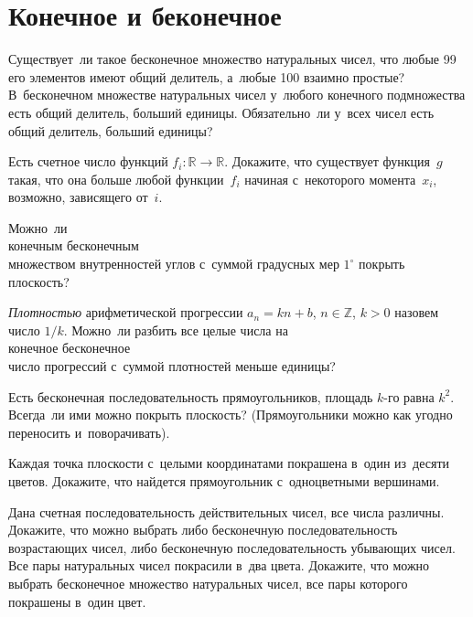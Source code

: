 
\section*{Конечное и беконечное}


\begin{problems}

\item
\subproblem
Существует~ли такое бесконечное множество натуральных чисел, что любые 99 его
элементов имеют общий делитель, а~любые 100 взаимно простые?
\\
\subproblem
В~бесконечном множестве натуральных чисел у~любого конечного подмножества есть
общий делитель, больший единицы.
Обязательно~ли у~всех чисел есть общий делитель, больший единицы?

\item
Есть счетное число функций $f_{i} \colon \mathbb{R} \to \mathbb{R}$.
Докажите, что существует функция~$g$ такая, что она больше любой
функции~$f_{i}$ начиная с~некоторого момента~$x_{i}$, возможно, зависящего
от~$i$.

\item
Можно~ли
\\
\subproblem конечным
\quad
\subproblem бесконечным
\\
множеством внутренностей углов с~суммой градусных мер $1^{\circ}$ покрыть
плоскость?

\item
\emph{Плотностью} арифметической прогрессии
$a_{n} = k n + b$, $n \in \mathbb{Z}$, $k > 0$ назовем число $1 / k$.
Можно~ли разбить все целые числа на
\\
\subproblem конечное
\quad
\subproblem бесконечное
\\
число прогрессий с~суммой плотностей меньше единицы?

\item
Есть бесконечная последовательность прямоугольников, площадь $k$-го равна
$k^2$.
Всегда~ли ими можно покрыть плоскость?
(Прямоугольники можно как угодно переносить и~поворачивать).

\item
Каждая точка плоскости с~целыми координатами покрашена в~один из~десяти цветов.
Докажите, что найдется прямоугольник с~одноцветными вершинами.

\item
\subproblem
Дана счетная последовательность действительных чисел, все числа различны.
Докажите, что можно выбрать либо бесконечную последовательность возрастающих
чисел, либо бесконечную последовательность убывающих чисел.
\\
\subproblem
Все пары натуральных чисел покрасили в~два цвета.
Докажите, что можно выбрать бесконечное множество натуральных чисел, все пары
которого покрашены в~один цвет.

\end{problems}

